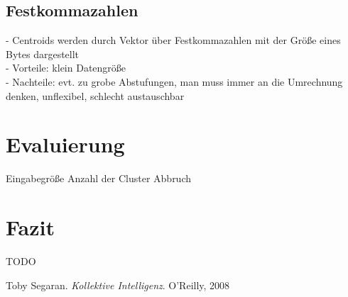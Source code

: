 \documentclass[a4paper]{llncs}
\begin{document}
\subsection{Festkommazahlen}
- Centroids werden durch Vektor über Festkommazahlen mit der Größe eines Bytes dargestellt\\
- Vorteile: klein Datengröße\\
- Nachteile: evt. zu grobe Abstufungen, man muss immer an die Umrechnung denken, unflexibel, schlecht austauschbar

\section{Evaluierung}
Eingabegröße
Anzahl der Cluster
Abbruch

\section{Fazit}
TODO

\begin{thebibliography}{--------}

	Toby Segaran.
  {\em Kollektive Intelligenz}.
   O'Reilly, 2008
   
\end{thebibliography}
\end{document}
